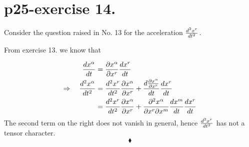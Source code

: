 \section{p25-exercise 14.}
\begin{tcolorbox}
Consider the question raised in No. 13 for the acceleration $\dv[2]{x^r}{t}$.
\end{tcolorbox}
From exercise 13. we know that 

 \begin{align}
 \dv{x^{\alpha}}{t} &= \pdv{x^{\alpha}}{x^r}\dv{x^r}{t}\\ 
 \Rightarrow\quad \dv[2]{x^{\alpha}}{t} &= \dv[2]{x^r}{t}\pdv{x^{\alpha}}{x^r}+ \dv{\pdv{x^{\alpha}}{x^r}}{t}\dv{x^r}{t}\\ 
 &= \dv[2]{x^r}{t}\pdv{x^{\alpha}}{x^r}+ \pdv{x^{\alpha}}{x^r}{x^m}\dv{x^m}{t}\dv{x^r}{t} 
 \end{align}
 The second term on the right does not vanish in general, hence $\dv[2]{x^r}{t}$ has not a tensor character.
$$\blacklozenge$$
\pagebreak[4]

